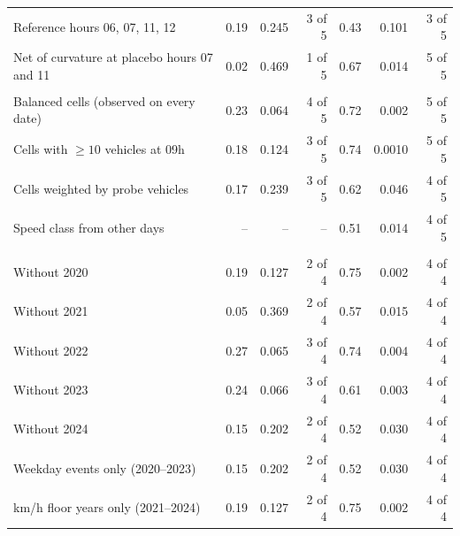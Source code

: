 \begin{tabular}{lrrrrrr}
\quad Reference hours 06, 07, 11, 12 & 0.19 & 0.245 & 3 of 5 & 0.43 & 0.101 & 3 of 5 \\
\quad Net of curvature at placebo hours 07 and 11 & 0.02 & 0.469 & 1 of 5 & 0.67 & 0.014 & 5 of 5 \\
\addlinespace
\multicolumn{7}{l}{\textit{Cells}} \\
\quad Balanced cells (observed on every date) & 0.23 & 0.064 & 4 of 5 & 0.72 & 0.002 & 5 of 5 \\
\quad Cells with $\geq 10$ vehicles at 09h & 0.18 & 0.124 & 3 of 5 & 0.74 & 0.0010 & 5 of 5 \\
\quad Cells weighted by probe vehicles & 0.17 & 0.239 & 3 of 5 & 0.62 & 0.046 & 4 of 5 \\
\quad Speed class from other days & -- & -- & -- & 0.51 & 0.014 & 4 of 5 \\
\addlinespace
\multicolumn{7}{l}{\textit{Years}} \\
\quad Without 2020 & 0.19 & 0.127 & 2 of 4 & 0.75 & 0.002 & 4 of 4 \\
\quad Without 2021 & 0.05 & 0.369 & 2 of 4 & 0.57 & 0.015 & 4 of 4 \\
\quad Without 2022 & 0.27 & 0.065 & 3 of 4 & 0.74 & 0.004 & 4 of 4 \\
\quad Without 2023 & 0.24 & 0.066 & 3 of 4 & 0.61 & 0.003 & 4 of 4 \\
\quad Without 2024 & 0.15 & 0.202 & 2 of 4 & 0.52 & 0.030 & 4 of 4 \\
\quad Weekday events only (2020--2023) & 0.15 & 0.202 & 2 of 4 & 0.52 & 0.030 & 4 of 4 \\
\quad 1 km/h floor years only (2021--2024) & 0.19 & 0.127 & 2 of 4 & 0.75 & 0.002 & 4 of 4 \\
\bottomrule
\end{tabular}
